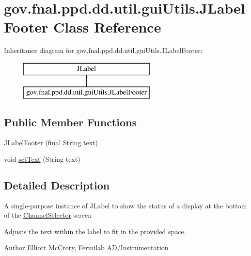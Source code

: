 \hypertarget{classgov_1_1fnal_1_1ppd_1_1dd_1_1util_1_1guiUtils_1_1JLabelFooter}{\section{gov.\-fnal.\-ppd.\-dd.\-util.\-gui\-Utils.\-J\-Label\-Footer Class Reference}
\label{classgov_1_1fnal_1_1ppd_1_1dd_1_1util_1_1guiUtils_1_1JLabelFooter}
}
Inheritance diagram for gov.\-fnal.\-ppd.\-dd.\-util.\-gui\-Utils.\-J\-Label\-Footer\-:\begin{figure}[H]
\begin{center}
\leavevmode
\includegraphics[height=2.000000cm]{classgov_1_1fnal_1_1ppd_1_1dd_1_1util_1_1guiUtils_1_1JLabelFooter}
\end{center}
\end{figure}
\subsection*{Public Member Functions}
\begin{DoxyCompactItemize}
\item 
\hyperlink{classgov_1_1fnal_1_1ppd_1_1dd_1_1util_1_1guiUtils_1_1JLabelFooter_aa9d75e5757c4c2e8625c7c2cf54bef17}{J\-Label\-Footer} (final String text)
\item 
void \hyperlink{classgov_1_1fnal_1_1ppd_1_1dd_1_1util_1_1guiUtils_1_1JLabelFooter_ab0c1cc40ed25b7af9eea15b8e3f34ac6}{set\-Text} (String text)
\end{DoxyCompactItemize}


\subsection{Detailed Description}
A single-\/purpose instance of J\-Label to show the status of a display at the bottom of the \hyperlink{classgov_1_1fnal_1_1ppd_1_1dd_1_1ChannelSelector}{Channel\-Selector} screen 

Adjusts the text within the label to fit in the provided space. 

\begin{DoxyAuthor}{Author}
Elliott Mc\-Crory, Fermilab A\-D/\-Instrumentation 
\end{DoxyAuthor}


